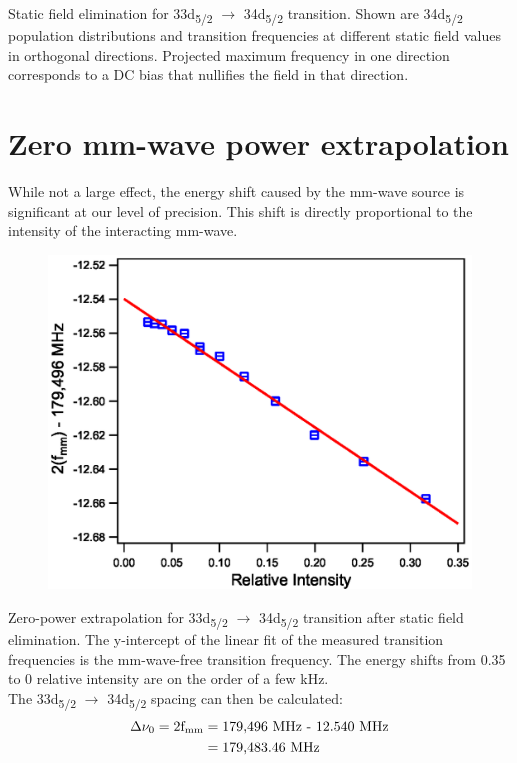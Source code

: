 \documentclass[landscape]{sciposter}
\begin{document}
\begin{multicols}{4}
Static field elimination for 33d\textsubscript{5/2} $\rightarrow$ 34d\textsubscript{5/2} transition. Shown are 34d\textsubscript{5/2} population distributions and transition frequencies at different static field values in orthogonal directions. Projected maximum frequency in one direction corresponds to a DC bias that nullifies the field in that direction.

\section*{\large Zero mm-wave power extrapolation}
While not a large effect, the energy shift caused by the mm-wave source is significant at our level of precision. This shift is directly proportional to the intensity of the interacting mm-wave. 

\begin{figure}
\begin{center}
\includegraphics[scale = 1.25]{33d52_PScans.eps}
\end{center}
\end{figure}

Zero-power extrapolation for 33d\textsubscript{5/2} $\rightarrow$ 34d\textsubscript{5/2} transition after static field elimination. The y-intercept of the linear fit of the measured transition frequencies is the mm-wave-free transition frequency. The energy shifts from 0.35 to 0 relative intensity are on the order of a few kHz.\\

The 33d\textsubscript{5/2} $\rightarrow$ 34d\textsubscript{5/2} spacing can then be calculated:
\begin{align*}
\Delta \nu_0 = \textrm{2f\textsubscript{mm}} &= \textrm{179,496 MHz - 12.540 MHz} \\ &= \textrm{179,483.46 MHz}
\end{align*}


\end{multicols}
\end{document}
